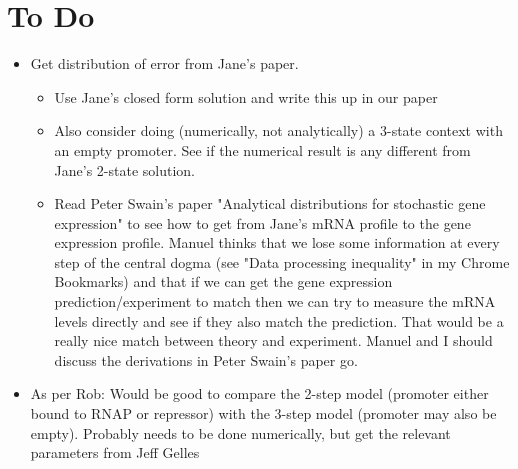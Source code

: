 \section{To Do}

\begin{itemize}	
	\item Get distribution of error from Jane's paper. 
	\begin{itemize}
		\item Use Jane's closed form solution and write this up in our paper
		
		\item Also consider doing (numerically, not analytically) a 3-state context
		with an empty promoter. See if the numerical result is any different from
		Jane's 2-state solution.
		
		\item Read Peter Swain's paper "Analytical distributions for stochastic gene
		expression" to see how to get from Jane's mRNA profile to the gene expression
		profile. Manuel thinks that we lose some information at every step of the
		central dogma (see "Data processing inequality" in my Chrome Bookmarks) and
		that if we can get the gene expression prediction/experiment to match then we
		can try to measure the mRNA levels directly and see if they also match the
		prediction. That would be a really nice match between theory and experiment.
		Manuel and I should discuss the derivations in Peter Swain's paper go.
	\end{itemize}
	
	\item As per Rob: Would be good to compare the 2-step model (promoter either
	bound to RNAP or repressor) with the 3-step model (promoter may also be empty).
	Probably needs to be done numerically, but get the relevant parameters from
	Jeff Gelles
	

\end{itemize}
